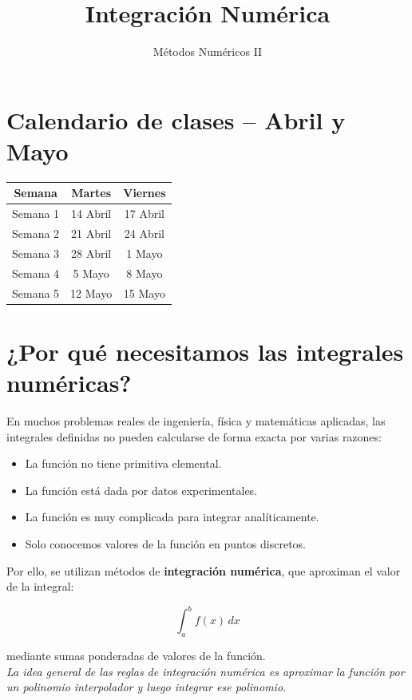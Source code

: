 \documentclass[12pt,a4paper]{article}
\title{Integración Numérica}
\author{Métodos Numéricos II}
\date{}
\begin{document}
\maketitle


\section*{Calendario de clases – Abril y Mayo}

\begin{center}
\begin{tabular}{ccc}
\toprule
Semana & Martes & Viernes \\
\midrule
Semana 1 & 14 Abril & 17 Abril \\
Semana 2 & 21 Abril & 24 Abril \\
Semana 3 & 28 Abril & 1 Mayo \\
Semana 4 & 5 Mayo & 8 Mayo \\
Semana 5 & 12 Mayo & 15 Mayo \\
\bottomrule
\end{tabular}
\end{center}


\section{¿Por qué necesitamos las integrales numéricas?}

En muchos problemas reales de ingeniería, física y matemáticas aplicadas, las integrales definidas no pueden calcularse de forma exacta por varias razones:

\begin{itemize}
\item La función no tiene primitiva elemental.
\item La función está dada por datos experimentales.
\item La función es muy complicada para integrar analíticamente.
\item Solo conocemos valores de la función en puntos discretos.
\end{itemize}

Por ello, se utilizan métodos de \textbf{integración numérica}, que aproximan el valor de la integral:

\[
\int_a^b f(x)\,dx
\]

mediante sumas ponderadas de valores de la función.\\

{\it 
La idea general de las reglas de integración numérica es aproximar la función por un polinomio interpolador y luego integrar ese polinomio.}
\end{document}
